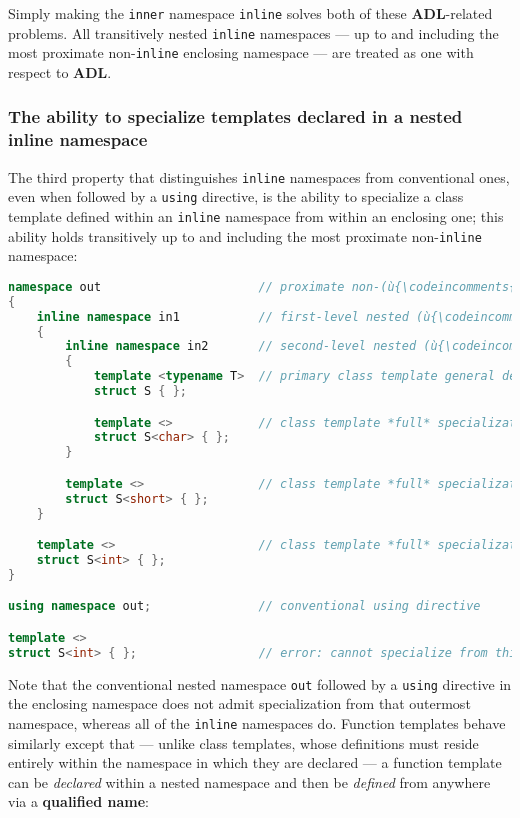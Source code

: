 Simply making the \texttt{inner} namespace \texttt{inline} solves both
of these \textbf{ADL}-related problems. All transitively nested
\texttt{inline} namespaces --- up to and including the most proximate
non-\texttt{inline} enclosing namespace --- are treated as one with
respect to \textbf{ADL}.

\subsubsection[The ability to specialize templates declared in a nested {\tt inline} namespace]{The ability to specialize templates declared in a nested {\SubsubsecCode inline} namespace}\label{the-ability-to-specialize-templates-declared-in-a-nested-inline-namespace}

The third property that distinguishes \texttt{inline} namespaces from
conventional ones, even when followed by a \texttt{using} directive, is
the ability to specialize a class template defined within an
\texttt{inline} namespace from within an enclosing one; this ability
holds transitively up to and including the most proximate
non-\texttt{inline} namespace:

\begin{lstlisting}[language=C++]
namespace out                      // proximate non-(ù{\codeincomments{inline}}ù) outer namespace
{
    inline namespace in1           // first-level nested (ù{\codeincomments{inline}}ù) namespace
    {
        inline namespace in2       // second-level nested (ù{\codeincomments{inline}}ù) namespace
        {
            template <typename T>  // primary class template general definition
            struct S { };

            template <>            // class template *full* specialization
            struct S<char> { };
        }

        template <>                // class template *full* specialization
        struct S<short> { };
    }

    template <>                    // class template *full* specialization
    struct S<int> { };
}

using namespace out;               // conventional using directive

template <>
struct S<int> { };                 // error: cannot specialize from this scope
\end{lstlisting}
    
\noindent Note that the conventional nested namespace \texttt{out} followed by a
\texttt{using} directive in the enclosing namespace does not admit
specialization from that outermost namespace, whereas all of the
\texttt{inline} namespaces do. Function templates behave similarly
except that --- unlike class templates, whose definitions must reside
entirely within the namespace in which they are declared --- a function
template can be \emph{declared} within a nested namespace and then be
\emph{defined} from anywhere via a \textbf{qualified name}:

